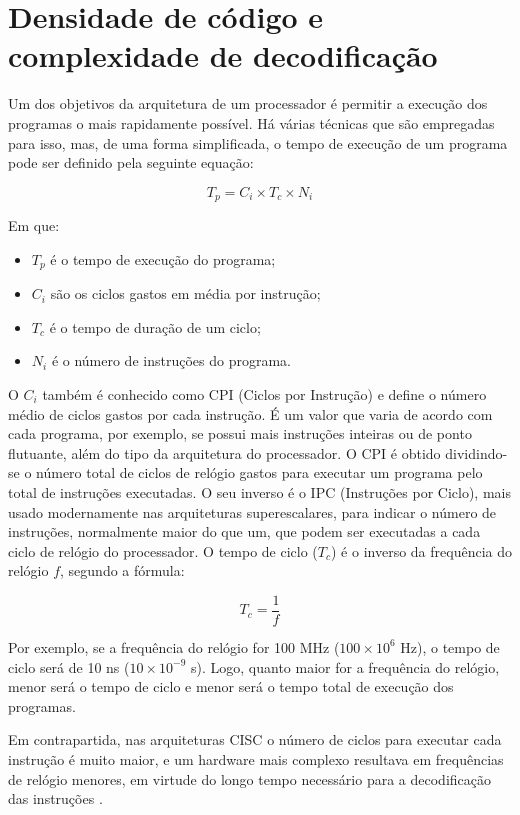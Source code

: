 \section{Densidade de código e complexidade de decodificação}
Um dos objetivos da arquitetura de um processador é permitir a execução dos programas o mais rapidamente possível. Há várias técnicas que são empregadas para isso, mas, de uma forma simplificada, o tempo de execução de um programa pode ser definido pela seguinte equação:

\begin{equation}
    T_p = C_i \times T_c \times N_i
    \label{eq:tp}
\end{equation}

Em que:
\begin{itemize}
    \item $T_p$ é o tempo de execução do programa;
    \item $C_i$ são os ciclos gastos em média por instrução;
    \item $T_c$ é o tempo de duração de um ciclo;
    \item $N_i$ é o número de instruções do programa.
\end{itemize}

O $C_i$ também é conhecido como CPI (Ciclos por Instrução) e define o número médio de ciclos gastos por cada instrução. É um valor que varia de acordo com cada programa, por exemplo, se possui mais instruções inteiras ou de ponto flutuante, além do tipo da arquitetura do processador. O CPI é obtido dividindo-se o número total de ciclos de relógio gastos para executar um programa pelo total de instruções executadas. O seu inverso é o IPC (Instruções por Ciclo), mais usado modernamente nas arquiteturas superescalares, para indicar o número de instruções, normalmente maior do que um, que podem ser executadas a cada ciclo de relógio do processador. O tempo de ciclo ($T_c$) é o inverso da frequência do relógio $f$, segundo a fórmula:

\begin{equation}
    T_c = \frac{1}{f}
    \label{eq:tc}
\end{equation}

Por exemplo, se a frequência do relógio for 100 MHz ($100 \times 10^{6}$ Hz), o tempo de ciclo será de 10 ns ($10 \times 10^{-9}$ s). Logo, quanto maior for a frequência do relógio, menor será o tempo de ciclo e menor será o tempo total de execução dos programas.

Em contrapartida, nas arquiteturas CISC o número de ciclos para executar cada instrução é muito maior, e um hardware mais complexo resultava em frequências de relógio menores, em virtude do longo tempo necessário para a decodificação das instruções \cite{silva2024}.

